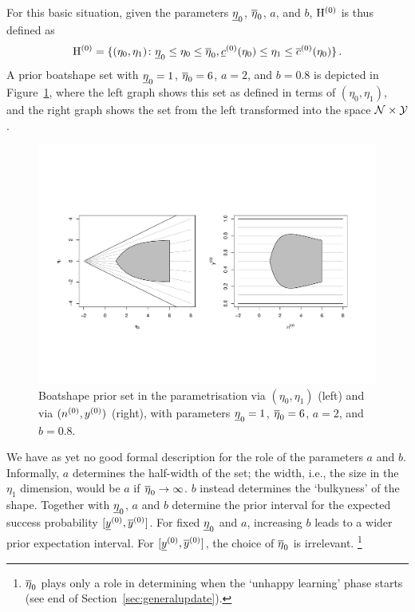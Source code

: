 For this basic situation, given the parameters $\underline{\eta}_0$, $\overline{\eta}_0$, $a$, and $b$,
$\mathrm{H}^{(0)}$ is thus defined as
\begin{align*}
\mathrm{H}^{(0)} =
\{(\eta_0,\eta_1) \colon \underline{\eta}_0 \le \eta_0 \le \overline{\eta}_0, \underline{c}^{(0)}(\eta_0) \le  \eta_1 \le \overline{c}^{(0)}(\eta_0) \}\,.
\end{align*}
A prior boatshape set with $\underline{\eta}_0=1$, $\overline{\eta}_0=6$, $a=2$, and $b=0.8$ is depicted in Figure~\ref{fig:boatshape-prior},
where the left graph shows this set as defined in terms of $(\eta_0,\eta_1)$,
and the right graph shows the set from the left transformed into the space $\mathcal{N} \times \mathcal{Y}$.

\begin{figure}  %
\centering
\includegraphics[trim = 15mm 45mm 25mm 60mm, clip, width=\textwidth]{R/boatshape-prior}
\caption[Boatshape prior set in the parametrisation via $(\eta_0,\eta_1)$ and via $(\nz,\yz)$.]%
{Boatshape prior set in the parametrisation via $(\eta_0,\eta_1)$ (left) and via $(\nz,\yz)$ (right),
with parameters $\underline{\eta}_0=1$, $\overline{\eta}_0=6$, $a=2$, and $b=0.8$.}
\label{fig:boatshape-prior}
\end{figure}


We have as yet no good formal description for the role of the parameters $a$ and $b$. %
Informally, $a$ determines the half-width of the set;
the width, i.e., the size in the $\eta_1$ dimension, would be $a$ if $\overline{\eta}_0 \to \infty$.
$b$ instead determines the `bulkyness' of the shape.
Together with $\underline{\eta}_0$, $a$ and $b$ determine the prior interval for the expected success probability $[\underline{y}^{(0)}, \overline{y}^{(0)}]$.
For fixed $\underline{\eta}_0$ and $a$, increasing $b$ leads to a wider prior expectation interval.
For $[\underline{y}^{(0)}, \overline{y}^{(0)}]$, the choice of $\overline{\eta}_0$ is irrelevant.%
\footnote{$\overline{\eta}_0$ plays only a role in determining when the `unhappy learning' phase starts
(see end of Section~\ref{sec:generalupdate}).}


